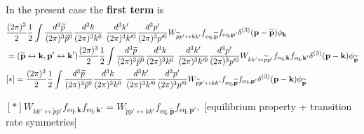 \documentclass[aps,prd,preprint,nofootinbib,amsmath,amssymb,showpacs,longbibliography,singlecolumn,superscriptaddress,10pt]{revtex4-1}
\theoremstyle{plain}
\theoremstyle{definition}
\begin{document}
In the present case the \textbf{first term} is
%
\begin{equation}
\begin{aligned}
&
\frac{(2 \pi)^{3}}{2} 
\frac{1}{2} \int \frac{d^{3}\widetilde{p}}{(2 \pi)^{3}\Tilde{p}^{0}} 
\frac{d^{3}k}{(2 \pi)^{3} k^{0}} \ \frac{d^{3}k'}{(2 \pi)^{3} k'^{0}} \frac{d^{3}p'}{(2 \pi)^{3} p'^{0}}  
W_{\widetilde{p}p' \leftrightarrow kk'} 
f_{\mathrm{eq},\widetilde{\textbf{p}}}
f_{\mathrm{eq},\textbf{p}'} \delta^{(3)}(\textbf{p} - \widetilde{\textbf{p}})  \phi_{\textbf{k}} 
\\
&
=
(\widetilde{\textbf{p}} \leftrightarrow \textbf{k},
\textbf{p}' \leftrightarrow \textbf{k}')
\frac{(2 \pi)^{3}}{2} 
\frac{1}{2} \int \frac{d^{3}\widetilde{p}}{(2 \pi)^{3}\Tilde{p}^{0}} 
\frac{d^{3}k}{(2 \pi)^{3} k^{0}} \ \frac{d^{3}k'}{(2 \pi)^{3} k'^{0}} \frac{d^{3}p'}{(2 \pi)^{3} p'^{0}}  
W_{kk' \leftrightarrow \widetilde{p}p'} 
f_{\mathrm{eq},\textbf{k}}
f_{\mathrm{eq},\textbf{k}'} \delta^{(3)}(\textbf{p} - \textbf{k})  \phi_{\widetilde{\textbf{p}}} 
\\
&
[*]
=
\frac{(2 \pi)^{3}}{2} 
\frac{1}{2} \int \frac{d^{3}\widetilde{p}}{(2 \pi)^{3}\Tilde{p}^{0}} 
\frac{d^{3}k}{(2 \pi)^{3} k^{0}} \ \frac{d^{3}k'}{(2 \pi)^{3} k'^{0}} \frac{d^{3}p'}{(2 \pi)^{3} p'^{0}}  
W_{\widetilde{p}p' \leftrightarrow kk'} 
f_{\mathrm{eq},\widetilde{\textbf{p}}}
f_{\mathrm{eq},\textbf{p}'} \delta^{(3)}(\textbf{p} - \textbf{k})  \phi_{\widetilde{\textbf{p}}} 
\end{aligned}    
\end{equation}

$[*]
W_{kk' \leftrightarrow \widetilde{p}p'} 
f_{\mathrm{eq},\textbf{k}}
f_{\mathrm{eq},\textbf{k}'}
=
W_{\widetilde{p}p' \leftrightarrow kk'} 
f_{\mathrm{eq},\widetilde{\textbf{p}}}
f_{\mathrm{eq},\textbf{p}'}
,$ [equilibrium property + transition rate symmetries]
\end{document}

